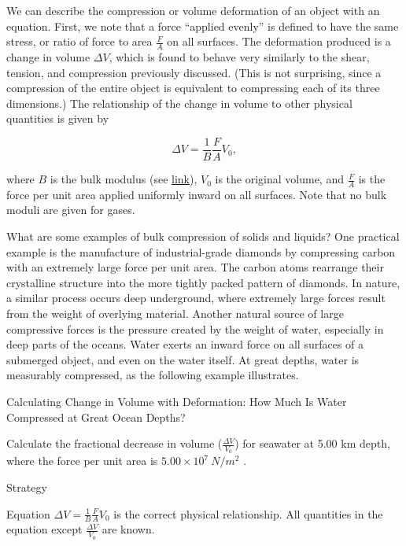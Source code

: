 \documentclass[
]{book}
\newenvironment{tinysection}{}{}
\begin{document}
We can describe the compression or volume deformation of an object with
an equation. First, we note that a force ``applied evenly'' is defined to
have the same stress, or ratio of force to area \(\frac{F}{A}{}\) on all
surfaces. The deformation produced is a change in volume \({\Delta V}{}\),
which is found to behave very similarly to the shear, tension, and
compression previously discussed. (This is not surprising, since a
compression of the entire object is equivalent to compressing each of
its three dimensions.) The relationship of the change in volume to other
physical quantities is given by

\leavevmode\hypertarget{eip-63}{}%
\[{{{\Delta V = \frac{1}{B}}\frac{F}{A}V_{0}},}{}\]

where \(B\) is the bulk modulus (see
\protect\hyperlink{import-auto-id1165298671576}{link}), \(V_{0}{}\)
is the original volume, and \emph{\(\frac{F}{A}{}\)} is the force per unit area
applied uniformly inward on all surfaces. Note that no bulk moduli are
given for gases.

What are some examples of bulk compression of solids and liquids? One
practical example is the manufacture of industrial-grade diamonds by
compressing carbon with an extremely large force per unit area. The
carbon atoms rearrange their crystalline structure into the more tightly
packed pattern of diamonds. In nature, a similar process occurs deep
underground, where extremely large forces result from the weight of
overlying material. Another natural source of large compressive forces
is the pressure created by the weight of water, especially in deep parts
of the oceans. Water exerts an inward force on all surfaces of a
submerged object, and even on the water itself. At great depths, water
is measurably compressed, as the following example illustrates.

\hypertarget{fs-id1165298751418}{}
Calculating Change in Volume with Deformation: How Much Is Water
Compressed at Great Ocean Depths?

Calculate the fractional decrease in volume (\(\frac{\Delta V}{V_{0}}{}\))
for seawater at 5.00 km depth, where the force per unit area is
\({5\text{.}{\text{00} \times \text{10}^{7}}\ {N/m^{2}}}{}\) .

\begin{tinysection}

{Strategy}

\end{tinysection}

Equation \({{\Delta V = \frac{1}{B}}\frac{F}{A}V_{0}}{}\) is the correct
physical relationship. All quantities in the equation except
\(\frac{\Delta V}{V_{0}}\) are known.
\end{document}
